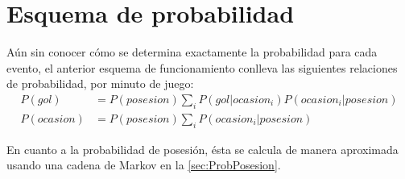 \documentclass[a4paper,9pt]{article}
\begin{document}
\section{Esquema de probabilidad}
Aún sin conocer cómo se determina exactamente la probabilidad para cada evento, el anterior esquema de funcionamiento conlleva las siguientes relaciones de probabilidad, por minuto de juego:
\begin{align}\label{eq:probgol}
P(gol)&=P(posesion)\sum_i{P(gol|ocasion_i)P(ocasion_i|posesion)}\\\label{eq:probocasion}
P(ocasion)&=P(posesion)\sum_i{P(ocasion_i|posesion)}
\end{align}

En cuanto a la probabilidad de posesión, ésta se calcula de manera aproximada usando una cadena de Markov en la \autoref{sec:ProbPosesion}.
\end{document}
